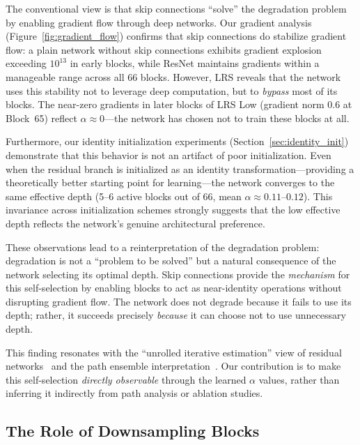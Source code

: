 \documentclass[preprint,12pt]{elsarticle}
\begin{document}
The conventional view is that skip connections ``solve'' the degradation problem by enabling gradient flow through deep networks. Our gradient analysis (Figure~\ref{fig:gradient_flow}) confirms that skip connections do stabilize gradient flow: a plain network without skip connections exhibits gradient explosion exceeding $10^{13}$ in early blocks, while ResNet maintains gradients within a manageable range across all 66 blocks. However, LRS reveals that the network uses this stability not to leverage deep computation, but to \emph{bypass} most of its blocks. The near-zero gradients in later blocks of LRS Low (gradient norm $0.6$ at Block~65) reflect $\alpha \approx 0$---the network has chosen not to train these blocks at all.

Furthermore, our identity initialization experiments (Section~\ref{sec:identity_init}) demonstrate that this behavior is not an artifact of poor initialization. Even when the residual branch is initialized as an identity transformation---providing a theoretically better starting point for learning---the network converges to the same effective depth (5--6 active blocks out of 66, mean $\alpha \approx 0.11$--$0.12$). This invariance across initialization schemes strongly suggests that the low effective depth reflects the network's genuine architectural preference.

These observations lead to a reinterpretation of the degradation problem: degradation is not a ``problem to be solved'' but a natural consequence of the network selecting its optimal depth. Skip connections provide the \emph{mechanism} for this self-selection by enabling blocks to act as near-identity operations without disrupting gradient flow. The network does not degrade because it fails to use its depth; rather, it succeeds precisely \emph{because} it can choose not to use unnecessary depth.

This finding resonates with the ``unrolled iterative estimation'' view of residual networks~\cite{greff2017highway} and the path ensemble interpretation~\cite{veit2016residual}. Our contribution is to make this self-selection \emph{directly observable} through the learned $\alpha$ values, rather than inferring it indirectly from path analysis or ablation studies.

\subsection{The Role of Downsampling Blocks}
\label{sec:downsampling_role}
\end{document}
